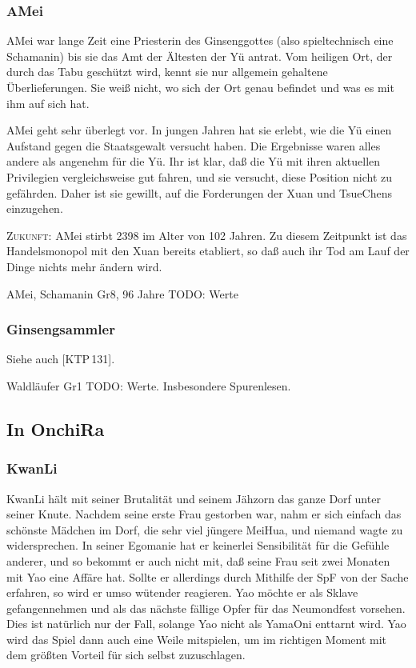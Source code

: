 \documentclass[
a4paper,
twoside,
DIV=calc,
BCOR=4mm,
fontsize=9pt,
twocolumn=on,
titlepage=on,
parskip=half
]{scrartcl}
\begin{document}
\subsubsection{AMei}

AMei war lange Zeit eine Priesterin des Ginsenggottes (also
spieltechnisch eine Schamanin) bis sie das Amt der Ältesten der Yü
antrat. Vom heiligen Ort, der durch das Tabu geschützt wird, kennt sie
nur allgemein gehaltene Überlieferungen. Sie weiß nicht, wo sich der
Ort genau befindet und was es mit ihm auf sich hat.

AMei geht sehr überlegt vor. In jungen Jahren hat sie erlebt, wie die
Yü einen Aufstand gegen die Staatsgewalt versucht haben. Die
Ergebnisse waren alles andere als angenehm für die Yü. Ihr ist klar,
daß die Yü mit ihren aktuellen Privilegien vergleichsweise gut fahren,
und sie versucht, diese Position nicht zu gefährden. Daher ist sie
gewillt, auf die Forderungen der Xuan und TsueChens einzugehen.

\textsc{Zukunft:} AMei stirbt 2398 im Alter von 102 Jahren. Zu diesem
Zeitpunkt ist das Handelsmonopol mit den Xuan bereits etabliert, so
daß auch ihr Tod am Lauf der Dinge nichts mehr ändern wird.

AMei, Schamanin Gr8, 96 Jahre
TODO: Werte

\subsubsection{Ginsengsammler}

Siehe auch [KTP\,131].

Waldläufer Gr1
TODO: Werte. Insbesondere Spurenlesen.

\subsection{In OnchiRa}

\subsubsection{KwanLi}

KwanLi hält mit seiner Brutalität und seinem Jähzorn das ganze Dorf
unter seiner Knute. Nachdem seine erste Frau gestorben war, nahm er
sich einfach das schönste Mädchen im Dorf, die sehr viel jüngere
MeiHua, und niemand wagte zu widersprechen. In seiner Egomanie hat er
keinerlei Sensibilität für die Gefühle anderer, und so bekommt er auch
nicht mit, daß seine Frau seit zwei Monaten mit Yao eine Affäre
hat. Sollte er allerdings durch Mithilfe der SpF von der Sache
erfahren, so wird er umso wütender reagieren. Yao möchte er als Sklave
gefangennehmen und als das nächste fällige Opfer für das Neumondfest
vorsehen. Dies ist natürlich nur der Fall, solange Yao nicht als
YamaOni enttarnt wird. Yao wird das Spiel dann auch eine Weile
mitspielen, um im richtigen Moment mit dem größten Vorteil für sich
selbst zuzuschlagen. 
\end{document}
